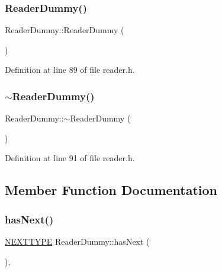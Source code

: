 \subsubsection{\texorpdfstring{Reader\+Dummy()}{ReaderDummy()}}
{\footnotesize\ttfamily Reader\+Dummy\+::\+Reader\+Dummy (\begin{DoxyParamCaption}{ }\end{DoxyParamCaption})\hspace{0.3cm}{\ttfamily [inline]}}



Definition at line 89 of file reader.\+h.

\mbox{\label{classReaderDummy_aa35fb0b96855f0c195a9bd1dee074112}} 
\subsubsection{\texorpdfstring{$\sim$\+Reader\+Dummy()}{~ReaderDummy()}}
{\footnotesize\ttfamily Reader\+Dummy\+::$\sim$\+Reader\+Dummy (\begin{DoxyParamCaption}{ }\end{DoxyParamCaption})\hspace{0.3cm}{\ttfamily [inline]}}



Definition at line 91 of file reader.\+h.



\subsection{Member Function Documentation}
\mbox{\label{classReaderDummy_aac648da900b0602ea67b84521de5114c}} 
\subsubsection{\texorpdfstring{has\+Next()}{hasNext()}}
{\footnotesize\ttfamily \hyperlink{classReaderInterface_ac2420ec8d2f60feadf2533d4fa77ec5e}{N\+E\+X\+T\+T\+Y\+PE} Reader\+Dummy\+::has\+Next (\begin{DoxyParamCaption}{ }\end{DoxyParamCaption})\hspace{0.3cm}{\ttfamily [inline]}, {\ttfamily [virtual]}}

